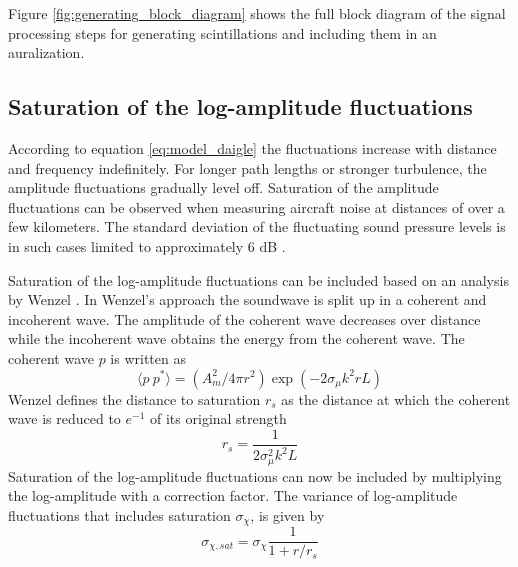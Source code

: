 Figure \ref{fig:generating_block_diagram} shows the full block diagram of the signal
processing steps for generating scintillations and including them in an auralization.


\subsection{Saturation of the log-amplitude fluctuations}
According to equation \eqref{eq:model_daigle} the fluctuations increase with distance and frequency indefinitely.
For longer path lengths or stronger turbulence, the amplitude fluctuations
gradually level off. Saturation of the amplitude fluctuations can be observed
when measuring aircraft noise at distances of over a few kilometers. The
standard deviation of the fluctuating sound pressure levels is in such cases
limited to approximately 6 dB \cite{Daigle1983}.

Saturation of the log-amplitude fluctuations can be included based on an analysis by Wenzel
\cite{Wenzel1975}. In Wenzel's approach the soundwave is split up in a coherent
and incoherent wave. The amplitude of the coherent wave decreases over distance
while the incoherent wave obtains the energy from the coherent wave. The
coherent wave $p$ is written as
\begin{equation}
 \langle p \  p^* \rangle = \left( A_m^2 / 4 \pi r^2 \right) \exp{\left( -2 \sigma_{\mu} k^2 r L \right)}
\end{equation}
Wenzel defines the distance to saturation $r_s$ as the distance at which the coherent wave is reduced to $e^{-1}$ of its original strength
\begin{equation}\label{eq:saturation_distance}
 r_s = \frac{1}{2 \sigma_{\mu}^2 k^2 L}
\end{equation}
Saturation of the log-amplitude fluctuations can now be included by multiplying the log-amplitude with a correction factor.
The variance of log-amplitude fluctuations that includes saturation $\sigma_{\chi}$, is given by
\begin{equation}\label{eq:saturation_logamp}
 \sigma_{\chi, sat} = \sigma_{\chi} \frac{ 1}{1 + r/r_s}
\end{equation}

